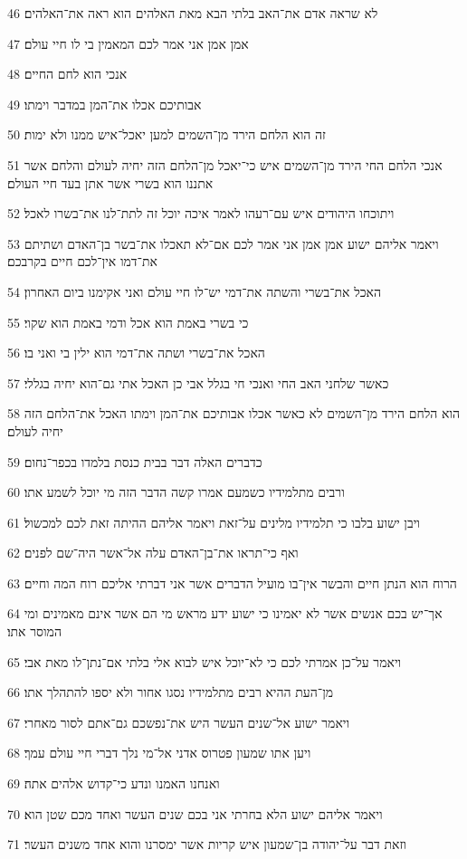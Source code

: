 \par 46 לא שראה אדם את־האב בלתי הבא מאת האלהים הוא ראה את־האלהים׃
\par 47 אמן אמן אני אמר לכם המאמין בי לו חיי עולם׃
\par 48 אנכי הוא לחם החיים׃
\par 49 אבותיכם אכלו את־המן במדבר וימתו׃
\par 50 זה הוא הלחם הירד מן־השמים למען יאכל־איש ממנו ולא ימות׃
\par 51 אנכי הלחם החי הירד מן־השמים איש כי־יאכל מן־הלחם הזה יחיה לעולם והלחם אשר אתננו הוא בשרי אשר אתן בעד חיי העולם׃
\par 52 ויתוכחו היהודים איש עם־רעהו לאמר איכה יוכל זה לתת־לנו את־בשרו לאכל׃
\par 53 ויאמר אליהם ישוע אמן אמן אני אמר לכם אם־לא תאכלו את־בשר בן־האדם ושתיתם את־דמו אין־לכם חיים בקרבכם׃
\par 54 האכל את־בשרי והשתה את־דמי יש־לו חיי עולם ואני אקימנו ביום האחרון׃
\par 55 כי בשרי באמת הוא אכל ודמי באמת הוא שקוי׃
\par 56 האכל את־בשרי ושתה את־דמי הוא ילין בי ואני בו׃
\par 57 כאשר שלחני האב החי ואנכי חי בגלל אבי כן האכל אתי גם־הוא יחיה בגללי׃
\par 58 הוא הלחם הירד מן־השמים לא כאשר אכלו אבותיכם את־המן וימתו האכל את־הלחם הזה יחיה לעולם׃
\par 59 כדברים האלה דבר בבית כנסת בלמדו בכפר־נחום׃
\par 60 ורבים מתלמידיו כשמעם אמרו קשה הדבר הזה מי יוכל לשמע אתו׃
\par 61 ויבן ישוע בלבו כי תלמידיו מלינים על־זאת ויאמר אליהם ההיתה זאת לכם למכשול׃
\par 62 ואף כי־תראו את־בן־האדם עלה אל־אשר היה־שם לפנים׃
\par 63 הרוח הוא הנתן חיים והבשר אין־בו מועיל הדברים אשר אני דברתי אליכם רוח המה וחיים׃
\par 64 אך־יש בכם אנשים אשר לא יאמינו כי ישוע ידע מראש מי הם אשר אינם מאמינים ומי המוסר אתו׃
\par 65 ויאמר על־כן אמרתי לכם כי לא־יוכל איש לבוא אלי בלתי אם־נתן־לו מאת אבי׃
\par 66 מן־העת ההיא רבים מתלמידיו נסגו אחור ולא יספו להתהלך אתו׃
\par 67 ויאמר ישוע אל־שנים העשר היש את־נפשכם גם־אתם לסור מאחרי׃
\par 68 ויען אתו שמעון פטרוס אדני אל־מי נלך דברי חיי עולם עמך׃
\par 69 ואנחנו האמנו ונדע כי־קדוש אלהים אתה׃
\par 70 ויאמר אליהם ישוע הלא בחרתי אני בכם שנים העשר ואחד מכם שטן הוא׃
\par 71 וזאת דבר על־יהודה בן־שמעון איש קריות אשר ימסרנו והוא אחד משנים העשר׃

